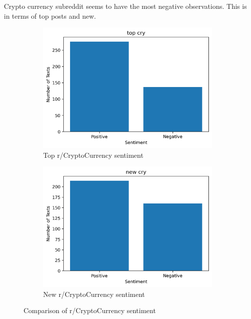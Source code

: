 Crypto currency subreddit seems to have the most negative observations. This is in terms of top posts and new.
\begin{figure}[H]
  \begin{subfigure}{0.48\linewidth}
    \includegraphics[width=\linewidth]{img/B1/top_cry_sentiment.png}
    \caption{Top r/CryptoCurrency sentiment}
    \label{fig:top_cry_sentiment}
  \end{subfigure}
  \begin{subfigure}{0.48\linewidth}
    \includegraphics[width=\linewidth]{img/B1/new_cry_sentiment.png}
    \caption{New r/CryptoCurrency sentiment}
    \label{fig:new_cry_sentiment}
  \end{subfigure}
  \caption{Comparison of r/CryptoCurrency sentiment}
  \label{fig:cry_sentiment}
\end{figure}
